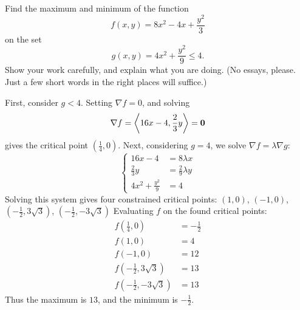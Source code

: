 \documentclass[12pt,answers]{exam}
\newcommand{\vect}[1]{\left\langle #1 \right\rangle}
\begin{document}
\begin{questions}
  
  \newpage
  \question
  Find the maximum and minimum of the function
  \[
  f(x,y) = 8x^2-4x+\frac{y^2}{3}
  \]
  on the set 
  \[
  g(x,y) = 4x^2 + \frac{y^2}{9} \le 4.
  \]
  Show your work carefully, and explain what you are doing. (No essays, please. Just a few short words in the right places will suffice.)
  \begin{solution}
    First, consider $g < 4$. Setting $\nabla f = 0$, and solving
    \[
    \nabla f = \vect{16x-4,\frac23 y} = \vb 0
    \]
    gives the critical point $(\frac14, 0)$.
    Next, considering $g = 4$, we solve $\nabla f = \lambda \nabla g$:
    \[
    \left\{
    \begin{aligned}
      16x-4&=8\lambda x\\
      \frac23y&=\frac29\lambda y\\
      4x^2 + \frac{y^2}{9} &= 4
    \end{aligned}
    \right.
    \]
    Solving this system gives 
    four constrained critical points: $(1,0)$, $(-1, 0)$, $(-\frac12, 3\sqrt 3)$, $(-\frac12, -3\sqrt 3)$
    Evaluating $f$ on the found critical points:
    \begin{align*}
      f(\frac14, 0) &= -\frac12 \\ 
      f(1,0) &= 4 \\
      f(-1, 0) &= 12 \\ 
      f(-\frac12, 3\sqrt 3) &= 13 \\
      f(-\frac12, -3\sqrt 3) &= 13
    \end{align*}
    Thus the maximum is $13$, and the minimum is $-\frac1{2}$.
  \end{solution}
  

\end{questions}
\end{document}
